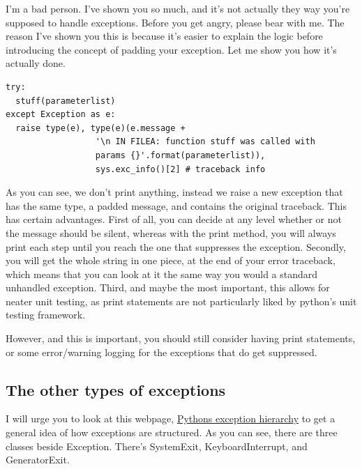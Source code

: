\documentclass[10pt,a4paper]{article}
\begin{document}
I'm a bad person. I've shown you so much, and it's not actually they way you're supposed to handle exceptions. Before you get angry, please bear with me. The reason I've shown you this is because it's easier to explain the logic before introducing the concept of padding your exception. Let me show you how it's actually done.

\begin{lstlisting}
try: 
  stuff(parameterlist)
except Exception as e:
  raise type(e), type(e)(e.message + 
                  '\n IN FILEA: function stuff was called with 
                  params {}'.format(parameterlist)), 
                  sys.exc_info()[2] # traceback info
\end{lstlisting}

As you can see, we don't print anything, instead we raise a new exception that has the same type, a padded message, and contains the original traceback. This has certain advantages. First of all, you can decide at any level whether or not the message should be silent, whereas with the print method, you will always print each step until you reach the one that suppresses the exception. Secondly, you will get the whole string in one piece, at the end of your error traceback, which means that you can look at it the same way you would a standard unhandled exception. Third, and maybe the most important, this allows for neater unit testing, as print statements are not particularly liked by python's unit testing framework. 

However, and this is important, you should still consider having print statements, or some error/warning logging for the exceptions that do get suppressed.

\subsection{The other types of exceptions}

I will urge you to look at this webpage, \href{https://docs.python.org/2/library/exceptions.html\#exception-hierarchy}{Pythons exception hierarchy} to get a general idea of how exceptions are structured. As you can see, there are three classes beside Exception. There's SystemExit, KeyboardInterrupt, and GeneratorExit. 
\end{document}

